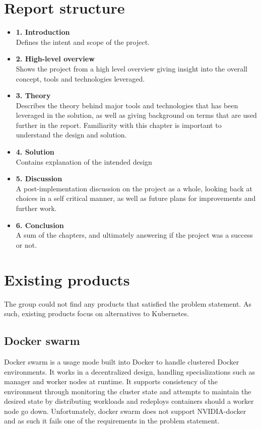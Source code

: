 \documentclass[../main.tex]{subfiles}
\begin{document}
\pagebreak\section{Report structure}
\begin{itemize}
    \item \textbf{1. Introduction}\\
            Defines the intent and scope of the project.
    \item\textbf{2. High-level overview}\\
            Shows the project from a high level overview giving insight into the overall concept, tools and technologies leveraged.
    \item\textbf{3. Theory}\\
            Describes the theory behind major tools and technologies that has been leveraged in the solution, as well as giving background on terms that are used further in the report. Familiarity with this chapter is important to understand the design and solution.
    \item\textbf{4. Solution}\\
            Contains explanation of the intended design
    \item\textbf{5. Discussion}\\
            A post-implementation discussion on the project as a whole, looking back at choices in a self critical manner, as well as future plans for improvements and further work.
    \item\textbf{6. Conclusion}\\
            A sum of the chapters, and ultimately answering if the project was a success or not.
\end{itemize}

\section{Existing products}
The group could not find any products that satisfied the problem statement. As such, existing products focus on alternatives to Kubernetes.
\subsection*{Docker swarm}
Docker swarm is a usage mode built into Docker to handle clustered Docker environments. It works in a decentralized design, handling specializations such as manager and worker nodes at runtime. It supports consistency of the environment through monitoring the cluster state and attempts to maintain the desired state by distributing workloads and redeploys containers should a worker node go down. Unfortunately, docker swarm does not support NVIDIA-docker and as such it fails one of the requirements in the problem statement. \cite{docker_swarm}
\end{document}
